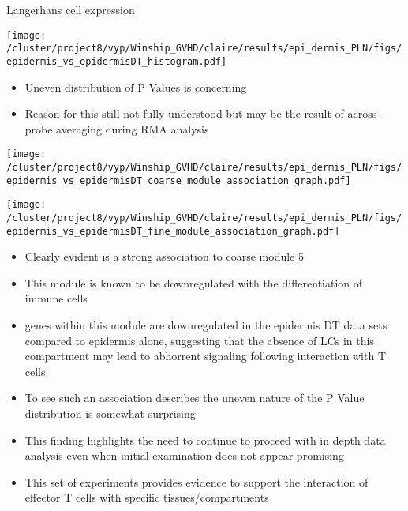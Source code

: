 \documentclass[final,hyperref={pdfpagelabels=false}]{beamer}
\begin{document}
\begin{frame}{}
\begin{columns}[t]
\begin{column}{.40\linewidth}
\begin{block}{Langerhans cell expression}
          \begin{minipage}{0.45\textwidth}
            \texttt{[image: /cluster/project8/vyp/Winship\_GVHD/claire/results/epi\_dermis\_PLN/figs/epidermis\_vs\_epidermisDT\_histogram.pdf]}
          \end{minipage}
	  \begin{minipage}{0.45\textwidth}
{\small          \begin{itemize}
            \item Uneven distribution of P Values is concerning 
            \item Reason for this still not fully understood but may be the result of across-probe averaging during RMA analysis 
           \end{itemize}}
	  \end{minipage}
	  \begin{minipage}{0.45\textwidth}
            \texttt{[image: /cluster/project8/vyp/Winship\_GVHD/claire/results/epi\_dermis\_PLN/figs/epidermis\_vs\_epidermisDT\_coarse\_module\_association\_graph.pdf]}
          \end{minipage}
	  \hfill
	  \begin{minipage}{0.45\textwidth}
            \texttt{[image: /cluster/project8/vyp/Winship\_GVHD/claire/results/epi\_dermis\_PLN/figs/epidermis\_vs\_epidermisDT\_fine\_module\_association\_graph.pdf]}
          \end{minipage}
\hfill
{\small	  \begin{itemize}
	    \item Clearly evident is a strong association to coarse module 5
	    \item This module is known to be downregulated with the differentiation of immune cells
		\item genes within this module are downregulated in the epidermis DT data sets compared to epidermis alone, suggesting that the absence of LCs in this compartment may lead to abhorrent signaling following interaction with T cells. 
		\item To see such an association describes the uneven nature of the P Value distribution is somewhat surprising 
	\item This finding highlights the need to continue to proceed with in depth data analysis even when initial examination does not appear promising  
	\item This set of experiments provides evidence to support the interaction of effector T cells with specific tissues/compartments 
	   \end{itemize}}
        \end{block}


\end{column}
\end{columns}
\end{frame}
\end{document}
